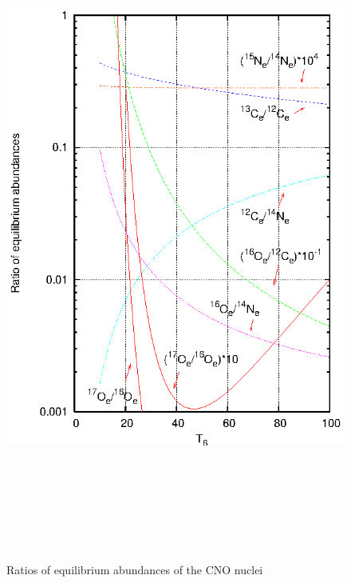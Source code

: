 \documentclass[12pt,a4paper,titlepage]{jarticle}
\begin{document}
\begin{figure}[H]
\begin{center}
\includegraphics[width=170mm,height=220mm]{CNO_Equi_Abund_ratio.eps}
\caption{Ratios of equilibrium abundances of the CNO nuclei}
\end{center}
\end{figure}
\end{document}
